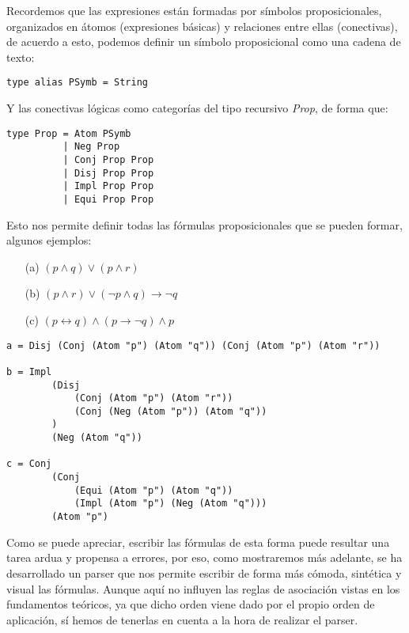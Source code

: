 \documentclass[a4paper]{report}
\begin{document}
Recordemos que las expresiones están formadas por símbolos proposicionales, organizados en átomos (expresiones básicas) y relaciones entre ellas (conectivas), de acuerdo a esto, podemos definir un símbolo proposicional como una cadena de texto:\\

\begin{lstlisting}[caption={Definición de Símbolo Proposicional como alias de String.}]
type alias PSymb = String 
\end{lstlisting}

Y las conectivas lógicas como categorías del tipo recursivo \textit{Prop}, de forma que:\\

\begin{lstlisting}[caption= Definición del tipo Prop (Proposición).]
type Prop = Atom PSymb
          | Neg Prop
          | Conj Prop Prop
          | Disj Prop Prop
          | Impl Prop Prop
          | Equi Prop Prop
\end{lstlisting}

Esto nos permite definir todas las fórmulas proposicionales que se pueden formar, algunos ejemplos: \\

\begin{multicols}{3}
\begin{itemize}
\item[(a)] $ (p \wedge q) \vee (p \wedge r)$
\item[(b)] $ (p \wedge r) \vee (\neg p \wedge q) \rightarrow \neg q$
\item[(c)] $(p \leftrightarrow q) \wedge (p \rightarrow \neg q) \wedge p$
\end{itemize}
\end{multicols}

\begin{lstlisting}[caption= Ejemplos de definición de fórmulas proposicionales.]
a = Disj (Conj (Atom "p") (Atom "q")) (Conj (Atom "p") (Atom "r"))
    
b = Impl 
        (Disj 
            (Conj (Atom "p") (Atom "r")) 
            (Conj (Neg (Atom "p")) (Atom "q"))
        ) 
        (Neg (Atom "q"))

c = Conj 
        (Conj 
            (Equi (Atom "p") (Atom "q")) 
            (Impl (Atom "p") (Neg (Atom "q"))) 
        (Atom "p")
\end{lstlisting}

Como se puede apreciar, escribir las fórmulas de esta forma puede resultar una tarea ardua y propensa a errores, por eso, como mostraremos más adelante, se ha desarrollado un parser que nos permite escribir de forma más cómoda, sintética y visual las fórmulas. Aunque aquí no influyen las reglas de asociación vistas en los fundamentos teóricos, ya que dicho orden viene dado por el propio orden de aplicación, sí hemos de tenerlas en cuenta a la hora de realizar el parser. 
\end{document}
